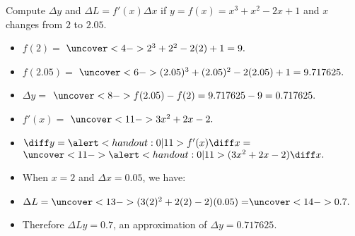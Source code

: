 \begin{frame}
\begin{example}%
Compute $\Delta y$ and $\Delta L= f'(x) \Delta x$ if $y = f(x) = x^3 + x^2 - 2x + 1$ and $x$ changes from $2$ to $2.05$.
\begin{itemize}
\item<2-| alert@3-4>  $f(2) =$ $\uncover<4->{2^3+2^2-2(2)+1 = 9.}$
\item<2-| alert@5-6>  $f(2.05) =$ $\uncover<6->{(2.05)^3+(2.05)^2-2(2.05)+1 = 9.717625.}$
\item<2-| alert@7-8>  $\Delta y =$ $\uncover<8->{f(2.05) - f(2) = 9.717625 - 9 = 0.717625.}$
\item<9-| alert@10-11>  $f'(x) = $ $\uncover<11->{3x^2 + 2x -2.}$
\item<9->  $\diff y = \alert<handout:0| 11>{f'(x)}\diff x = $ $\uncover<11->{\alert<handout:0| 11>{(3x^2+2x-2)}\diff x.}$
\item<12->  When $x = 2$ and $\Delta x = 0.05$, we have:
\item<12-| alert@13-14>  $\Delta L = \uncover<13->{(3(2)^2 + 2(2) - 2)(0.05) =} \uncover<14->{0.7.}$
\item<15->  Therefore $\Delta L y = 0.7$, an approximation of $\Delta y = 0.717625$.
\end{itemize}
\end{example}
\end{frame}
